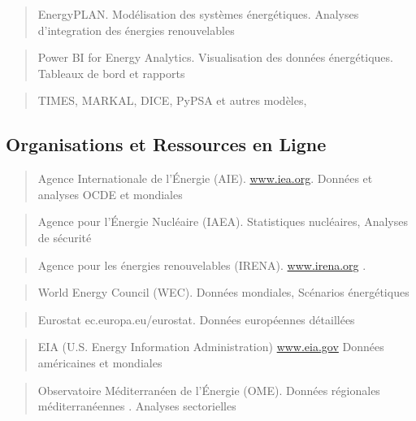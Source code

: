 \documentclass[a4paper,11pt]{report}
\begin{document}
\begin{quote}
EnergyPLAN. Modélisation des systèmes énergétiques. Analyses d'integration des énergies renouvelables
\end{quote}

\begin{quote}
Power BI for Energy Analytics. Visualisation des données énergétiques. Tableaux de bord et rapports
\end{quote}

\begin{quote}
TIMES, MARKAL, DICE, PyPSA et autres modèles,
\end{quote}

\subsection{Organisations et Ressources en Ligne}\label{organisations-et-ressources-en-ligne}

\begin{quote}
Agence Internationale de l'Énergie (AIE). \href{http://www.iea.org/}{www.iea.org}. Données et analyses OCDE et mondiales
\end{quote}

\begin{quote}
Agence pour l'Énergie Nucléaire (IAEA). Statistiques nucléaires, Analyses de sécurité
\end{quote}

\begin{quote}
Agence pour les énergies renouvelables (IRENA). \href{http://www.irena.org/}{www.irena.org} .
\end{quote}

\begin{quote}
World Energy Council (WEC). Données mondiales, Scénarios énergétiques
\end{quote}

\begin{quote}
Eurostat ec.europa.eu/eurostat. Données européennes détaillées
\end{quote}

\begin{quote}
EIA (U.S. Energy Information Administration) \href{http://www.eia.gov/}{www.eia.gov} Données américaines et mondiales
\end{quote}

\begin{quote}
Observatoire Méditerranéen de l'Énergie (OME). Données régionales méditerranéennes . Analyses sectorielles
\end{quote}
\end{document}
